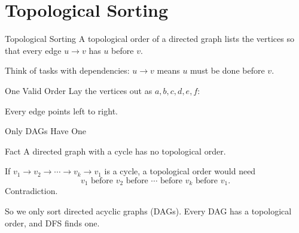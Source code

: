 \documentclass[10pt,aspectratio=169]{beamer}
\begin{document}
\section{Topological Sorting}

\begin{frame}{Topological Sorting}
  A \alert{topological order} of a directed graph lists the vertices so that
  every edge $u \to v$ has $u$ \alert{before} $v$.

  \bigskip
  Think of tasks with dependencies: $u \to v$ means $u$ must be done before
  $v$.

  \bigskip
  \begin{center}
  \end{center}
\end{frame}

\begin{frame}{One Valid Order}
  Lay the vertices out as $a, b, c, d, e, f$:

  \bigskip
  \begin{center}
  \end{center}

  \bigskip
  \begin{center}
    Every edge points \alert{left to right}.
  \end{center}
\end{frame}

\begin{frame}{Only DAGs Have One}
  \begin{block}{Fact}
    A directed graph with a cycle has \alert{no} topological order.
  \end{block}

  \bigskip
  If $v_1 \to v_2 \to \cdots \to v_k \to v_1$ is a cycle, a topological order
  would need
  \[
    v_1 \text{ before } v_2 \text{ before } \cdots \text{ before } v_k
    \text{ before } v_1.
  \]
  Contradiction.

  \bigskip
  \pause
  So we only sort \alert{directed acyclic graphs} (DAGs). Every DAG has a
  topological order, and DFS finds one.
\end{frame}
\end{document}
